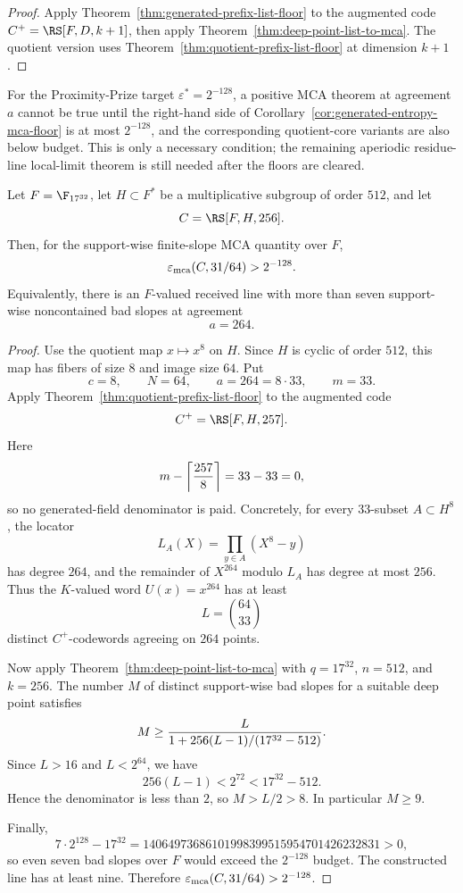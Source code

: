 \begin{proof}
Apply Theorem~\ref{thm:generated-prefix-list-floor} to the augmented code
\(C^+=\RS[F,D,k+1]\), then apply
Theorem~\ref{thm:deep-point-list-to-mca}.  The quotient version uses
Theorem~\ref{thm:quotient-prefix-list-floor} at dimension \(k+1\).
\end{proof}

\begin{remark}
For the Proximity-Prize target \(\varepsilon^*=2^{-128}\), a positive MCA theorem
at agreement \(a\) cannot be true until the right-hand side of
Corollary~\ref{cor:generated-entropy-mca-floor} is at most \(2^{-128}\), and the
corresponding quotient-core variants are also below budget.  This is only a
necessary condition; the remaining aperiodic residue-line local-limit theorem is
still needed after the floors are cleared.
\end{remark}


\begin{corollary}
\label{cor:strict264-quotient-floor}
Let \(F=\F_{17^{32}}\), let \(H\subset F^*\) be a multiplicative subgroup of
order \(512\), and let
\[
  C=\RS[F,H,256].
\]
Then, for the support-wise finite-slope MCA quantity over \(F\),
\[
  \varepsilon_{\rm mca}(C,31/64)>2^{-128}.
\]
Equivalently, there is an \(F\)-valued received line with more than seven
support-wise noncontained bad slopes at agreement
\[
  a=264.
\]
\end{corollary}

\begin{proof}
Use the quotient map \(x\mapsto x^8\) on \(H\).  Since \(H\) is cyclic of order
\(512\), this map has fibers of size \(8\) and image size \(64\).  Put
\[
  c=8,
  \qquad N=64,
  \qquad a=264=8\cdot 33,
  \qquad m=33.
\]
Apply Theorem~\ref{thm:quotient-prefix-list-floor} to the augmented code
\[
  C^+=\RS[F,H,257].
\]
Here
\[
  m-\left\lceil {257\over 8}\right\rceil=33-33=0,
\]
so no generated-field denominator is paid.  Concretely, for every
\(33\)-subset \(A\subset H^8\), the locator
\[
  L_A(X)=\prod_{y\in A}(X^8-y)
\]
has degree \(264\), and the remainder of \(X^{264}\) modulo \(L_A\) has degree
at most \(256\).  Thus the \(K\)-valued word \(U(x)=x^{264}\) has at least
\[
  L=\binom{64}{33}
\]
distinct \(C^+\)-codewords agreeing on \(264\) points.

Now apply Theorem~\ref{thm:deep-point-list-to-mca} with \(q=17^{32}\),
\(n=512\), and \(k=256\).  The number \(M\) of distinct support-wise bad slopes
for a suitable deep point satisfies
\[
  M\geq {L\over 1+256(L-1)/(17^{32}-512)}.
\]
Since \(L>16\) and \(L<2^{64}\), we have
\[
  256(L-1)<2^{72}<17^{32}-512.
\]
Hence the denominator is less than \(2\), so \(M>L/2>8\).  In particular
\(M\geq 9\).

Finally,
\[
  7\cdot 2^{128}-17^{32}
  =14064973686101998399515954701426232831>0,
\]
so even seven bad slopes over \(F\) would exceed the \(2^{-128}\) budget.  The
constructed line has at least nine.  Therefore
\(\varepsilon_{\rm mca}(C,31/64)>2^{-128}\).
\end{proof}

